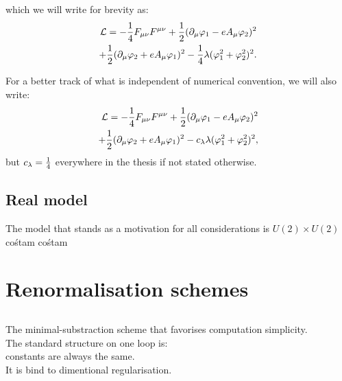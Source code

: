 which we will write for brevity as:
\begin{align}
\mathcal{L} = -\frac{1}{4}F_{\mu\nu}F^{\mu\nu}+ 
\frac{1}{2}(\partial_\mu\varphi_1 - eA_\mu\varphi_2)^2\\
+\frac{1}{2}(\partial_\mu\varphi_2+eA_\mu\varphi_1)^2
-\frac{1}{4}\lambda(\varphi_1^2+\varphi_2^2)^2. \notag
\end{align}


For a better track of what is independent of numerical convention, we will also write:
\begin{align}\label{scalar_electrodynamics}
\mathcal{L} = -\frac{1}{4}F_{\mu\nu}F^{\mu\nu}+ 
\frac{1}{2}(\partial_\mu\varphi_1 - eA_\mu\varphi_2)^2\\
+\frac{1}{2}(\partial_\mu\varphi_2+eA_\mu\varphi_1)^2
-c_\lambda\lambda(\varphi_1^2+\varphi_2^2)^2, \notag
\end{align}
but $c_\lambda = \frac{1}{4}$ everywhere in the thesis if not stated otherwise.
\subsection{Real model}
The model that stands as a motivation for all considerations is
$U(2)\times U(2)$ cośtam cośtam

\section{Renormalisation schemes}
\subsection{\texorpdfstring{\MSbar}{MS-bar}}
The minimal-substraction scheme that favorises computation simplicity. \\
The standard structure on one loop is:
 \\
constants are always the same. \\
It is bind to dimentional regularisation.
